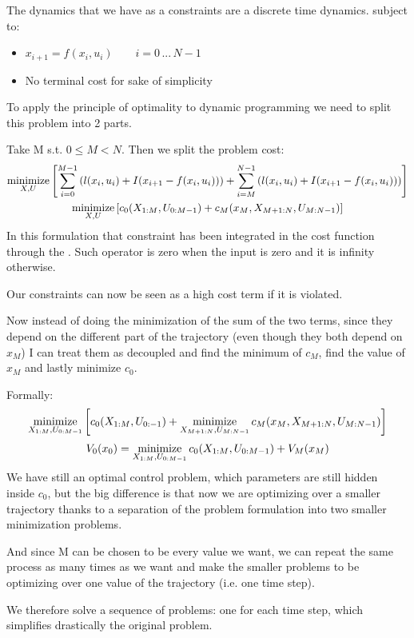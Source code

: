 The dynamics	that we have as a constraints are a discrete time dynamics.
subject to:
\begin{itemize}
\item $x_{i+1} = f(x_i, u_i)\qquad i = 0\,...\,N-1$
\item No terminal cost for sake of simplicity
\end{itemize}

To apply the principle of optimality to dynamic programming we need to split this problem into 2 parts.

Take M s.t. $0 \le M < N$. Then we split the problem cost:
\begin{gather}
\operatorname*{minimize}_{X, U} \left[\sum_{i=0}^{M-1} \left( l(x_i, u_i) + I(x_{i+1} - f(x_i, u_i))\right) + \sum_{i=M}^{N-1}\left( l(x_i, u_i) + I(x_{i+1} - f(x_i, u_i))\right)\right]\\
\operatorname*{minimize}_{X, U} \left[c_0(X_{1:M}, U_{0:M-1}) + c_M(x_M, X_{M+1:N}, U_{M:N-1})\right]
\end{gather}
In this formulation that constraint has been integrated in the cost function through the . Such operator is zero when the input is zero and it is infinity otherwise.

Our constraints can now be seen as a high cost term if it is violated.

Now instead of doing the minimization of the sum of the two terms, since they depend on the different part of the trajectory (even though they both depend on $x_M$) I can treat them as decoupled and find the minimum of $c_M$, find the value of $x_M$ and lastly minimize $c_0$.

Formally:
\[\operatorname*{minimize}_{X_{1:M}, U_{0:M-1}}\left[c_0(X_{1:M},U_{0:-1}) + \operatorname*{minimize}_{X_{M+1:N}, U_{M:N-1}} c_M(x_M, X_{M+1:N}, U_{M:N-1})\right]\]
\[V_0(x_0) = \operatorname*{minimize}_{X_{1:M}, U_{0:M-1}} c_0(X_{1:M}, U_{0:M-1}) + V_M(x_M)\]
We have still an optimal control problem, which parameters are still hidden inside $c_0$, but the big difference is that now we are optimizing over a smaller trajectory thanks to a separation of the problem formulation into two smaller minimization problems.

And since M can be chosen to be every value we want, we can repeat the same process as many times as we want and make the smaller problems to be optimizing over one value of the trajectory (i.e. one time step).

We therefore solve a sequence of problems: one for each time step, which simplifies drastically the original problem.

